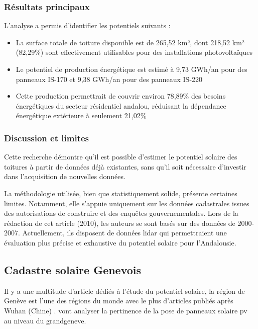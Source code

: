 \subsubsection{Résultats principaux}
\par{L'analyse a permis d'identifier les potentiels suivants :}
\begin{itemize}
    \item La surface totale de toiture disponible est de 265,52 km², dont 218,52 km² (82,29\%) sont effectivement utilisables pour des installations photovoltaïques
    \item Le potentiel de production énergétique est estimé à 9,73 GWh/an pour des panneaux IS-170 et 9,38 GWh/an pour des panneaux IS-220
    \item Cette production permettrait de couvrir environ 78,89\% des besoins énergétiques du secteur résidentiel andalou, réduisant la dépendance énergétique extérieure à seulement 21,02\%
\end{itemize}

\subsubsection{Discussion et limites}
\par{Cette recherche démontre qu'il est possible d'estimer le potentiel solaire des toitures à partir de données déjà existantes, sans qu'il soit nécessaire d'investir dans l’acquisition de nouvelles données.}

\par{La méthodologie utilisée, bien que statistiquement solide, présente certaines limites. Notamment, elle s'appuie uniquement sur les données cadastrales issues des autorisations de construire et des enquêtes gouvernementales. Lors de la rédaction de cet article (2010), les auteurs se sont basés sur des données de 2000-2007. Actuellement, ils disposent de données \gls{lidar} \cite{nacional_plan_nodate} qui permettraient une évaluation plus précise et exhaustive du potentiel solaire pour l'Andalousie.}

\subsection{Cadastre solaire Genevois}

\par{Il y a une multitude d'article dédiés à l'étude du potentiel solaire, la région de Genève est l'une des régions du monde avec le plus d'articles publiés après Wuhan (Chine) \cite{drozd_evaluating_2025}. \citeauthor{thebault_large-scale_2022} \cite{thebault_large-scale_2022} vont analyser la pertinence de la pose de panneaux solaire \acrshort{pv} au niveau du \acrshort{grandgeneve}.}

